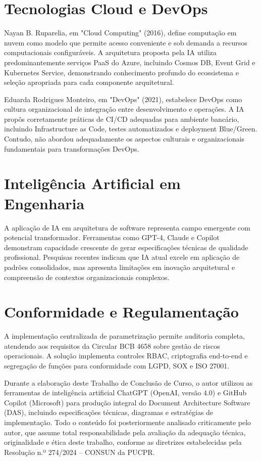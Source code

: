 \section{Tecnologias Cloud e DevOps}

Nayan B. Ruparelia, em "Cloud Computing" (2016), define computação em nuvem como modelo que permite acesso conveniente e sob demanda a recursos computacionais configuráveis. A arquitetura proposta pela IA utiliza predominantemente serviços PaaS do Azure, incluindo Cosmos DB, Event Grid e Kubernetes Service, demonstrando conhecimento profundo do ecossistema e seleção apropriada para cada componente arquitetural.

Eduarda Rodrigues Monteiro, em "DevOps" (2021), estabelece DevOps como cultura organizacional de integração entre desenvolvimento e operações. A IA propôs corretamente práticas de CI/CD adequadas para ambiente bancário, incluindo Infrastructure as Code, testes automatizados e deployment Blue/Green. Contudo, não abordou adequadamente os aspectos culturais e organizacionais fundamentais para transformações DevOps.

\section{Inteligência Artificial em Engenharia}

A aplicação de IA em arquitetura de software representa campo emergente com potencial transformador. Ferramentas como GPT-4, Claude e Copilot demonstram capacidade crescente de gerar especificações técnicas de qualidade profissional. Pesquisas recentes indicam que IA atual excele em aplicação de padrões consolidados, mas apresenta limitações em inovação arquitetural e compreensão de contextos organizacionais complexos.

\section{Conformidade e Regulamentação}

A implementação centralizada de parametrização permite auditoria completa, atendendo aos requisitos da Circular BCB 4658 sobre gestão de riscos operacionais. A solução implementa controles RBAC, criptografia end-to-end e segregação de funções para conformidade com LGPD, SOX e ISO 27001.

Durante a elaboração deste Trabalho de Conclusão de Curso, o autor utilizou as ferramentas de inteligência artificial ChatGPT (OpenAI, versão 4.0) e GitHub Copilot (Microsoft) para produção integral do Document Architecture Software (DAS), incluindo especificações técnicas, diagramas e estratégias de implementação. Todo o conteúdo foi posteriormente analisado criticamente pelo autor, que assume total responsabilidade pela avaliação da adequação técnica, originalidade e ética deste trabalho, conforme as diretrizes estabelecidas pela Resolução n.º 274/2024 – CONSUN da PUCPR.

